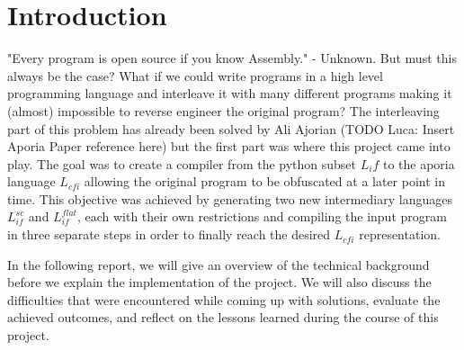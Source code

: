 \section{Introduction}

"Every program is open source if you know Assembly." - Unknown. But must this always be the case? What if we could write programs in a high level programming language and
interleave it with many different programs making it (almost) impossible to reverse engineer the original program? The interleaving part of this problem has already been 
solved by Ali Ajorian (TODO Luca: Insert Aporia Paper reference here) but the first part was where this project came into play.
The goal was to create a compiler from the python subset $L_if$ to the aporia language $L_{cfi}$ allowing the original program to be obfuscated at a later point in time.
This objective was achieved by generating two new intermediary languages $L_{if}^{sc}$ and $L_{if}^{flat}$, each with their own restrictions and compiling the input program 
in three separate steps in order to finally reach the desired $L_{cfi}$ representation.


In the following report, we will give an overview of the technical background before we explain the implementation of the project. We will also discuss the difficulties that were 
encountered while coming up with solutions, evaluate the achieved outcomes, and reflect on the lessons learned during the course of this project.